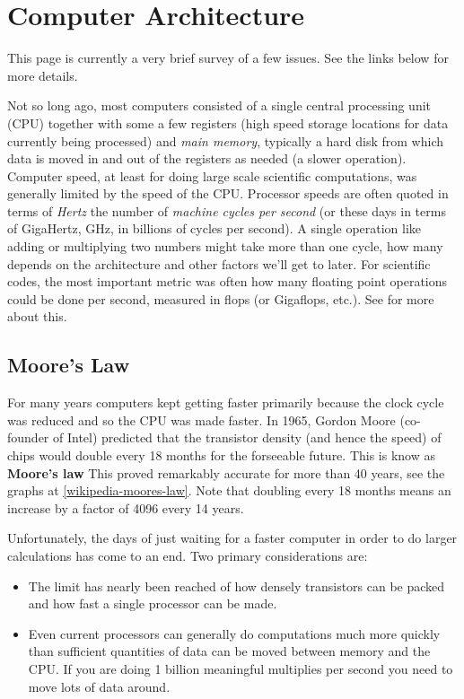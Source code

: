 \documentclass[letterpaper,10pt,english]{sphinxmanual}
\begin{document}
\section{Computer Architecture}
\label{computer_arch:computer-architecture}\label{computer_arch:computer-arch}\label{computer_arch::doc}
This page is currently a very brief survey of a few issues.  See the links
below for more details.

Not so long ago, most computers consisted of a single central processing unit
(CPU) together with some a few registers (high speed storage locations for
data currently being processed) and \emph{main memory}, typically a hard disk
from which data is moved in and out of the registers as needed (a slower
operation).  Computer speed, at least for doing large scale scientific
computations, was generally limited by the speed of the CPU.  Processor
speeds are often quoted in terms of \emph{Hertz} the number of \emph{machine cycles
per second} (or these days in terms of GigaHertz, GHz, in billions of cycles
per second).  A single operation like adding or multiplying two numbers
might take more than one cycle, how many depends on the architecture and
other factors we'll get to later.  For scientific codes, the most important
metric was often how many floating point operations could be done per
second, measured in flops (or Gigaflops, etc.).
See {\hyperref[metrics:flops]{}} for more about this.


\subsection{Moore's Law}
\label{computer_arch:moore-s-law}\label{computer_arch:moores-law}
For many years computers kept getting faster primarily because the clock
cycle was reduced and so the CPU was made faster.  In 1965, Gordon Moore
(co-founder of Intel) predicted that the transistor density (and hence the
speed) of chips would double every 18 months for the forseeable future.
This is know as \textbf{Moore's law}
This proved remarkably accurate for more than 40 years, see the graphs at
\href{http://en.wikipedia.org/wiki/Moore\%27s\_law}{{[}wikipedia-moores-law{]}}.
Note that doubling every 18 months means an increase by a factor of 4096
every 14 years.

Unfortunately, the days of just waiting for a faster computer in order to do
larger calculations has come to an end.  Two primary considerations are:
\begin{itemize}
\item {} 
The limit has nearly been reached of how densely transistors can be
packed and how fast a single processor can be made.

\item {} 
Even current processors can generally do computations much more quickly
than sufficient quantities of data can be moved between memory and
the CPU.  If you are doing 1 billion meaningful multiplies per second
you need to move lots of data around.

\end{itemize}
\end{document}
